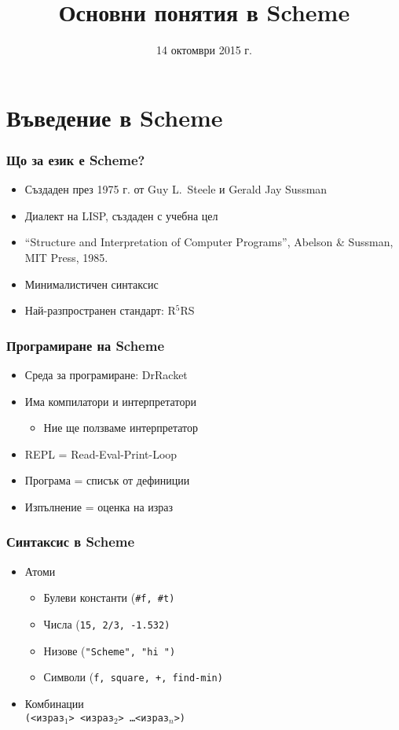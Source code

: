 \documentclass{beamer}
\title{Основни понятия в Scheme}
\date{14 октомври 2015 г.}
\begin{document}
\begin{frame}
  \titlepage
\end{frame}

\section{Въведение в Scheme}

\begin{frame}
  \frametitle{Що за език е Scheme?}

  \begin{itemize}
  \item Създаден през 1975 г. от Guy L.~Steele и  Gerald Jay Sussman
  \item Диалект на LISP, създаден с учебна цел
  \item ``Structure and Interpretation of Computer Programs'', Abelson \& Sussman, MIT Press, 1985.
  \item Минималистичен синтаксис
  \item Най-разпространен стандарт: R$^5$RS
  \end{itemize}
\end{frame}

\begin{frame}
  \frametitle{Програмиране на Scheme}

  \begin{itemize}
  \item Среда за програмиране: DrRacket
  \item Има компилатори и интерпретатори
    \begin{itemize}
    \item Ние ще ползваме интерпретатор
    \end{itemize}
  \item REPL = Read-Eval-Print-Loop
  \item Програма = списък от дефиниции
  \item Изпълнение = оценка на израз
  \end{itemize}
\end{frame}

\begin{frame}
  \frametitle{Синтаксис в Scheme}

  \begin{itemize}
  \item Атоми
    \begin{itemize}
    \item Булеви константи (\tt{\#f}, \tt{\#t})
    \item Числа (\tt{15}, \tt{2/3}, \tt{-1.532})
    \item Низове (\tt{"Scheme"}, \tt{"hi "})
    \item Символи (\tt f, \tt{square}, \tt +, \tt{find-min})
    \end{itemize}
  \item Комбинации\\
    \vspace{1em}
    \tt{\alert({}<израз$_1$> <израз$_2$> \ldots <израз$_n$>\alert)}
  \end{itemize}
\end{frame}
\end{document}

